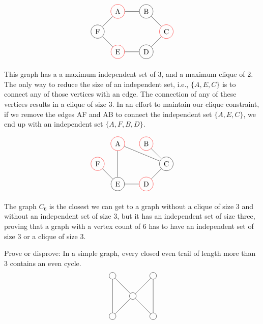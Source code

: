 \documentclass[12pt]{article}
\newenvironment{question}[2][Question]{\begin{trivlist}
\item[\hskip \labelsep {\bfseries #1}\hskip \labelsep {\bfseries #2.}]}{\end{trivlist}}
\begin{document}
\begin{align*}
\begin{tikzpicture}
\node[shape=circle,draw=red] (A) at (1,2) {A};
\node[shape=circle,draw=black] (B) at (2.4142857,2) {B};
\node[shape=circle,draw=red] (C) at (3.4142856,1) {C};
\node[shape=circle,draw=black] (D) at (2.4142857,0) {D};
\node[shape=circle,draw=red] (E) at (1,0) {E};
\node[shape=circle,draw=black] (F) at (0,1) {F};
\path [] (A) edge node[left] {} (B);
\path [] (B) edge node[left] {} (C);
\path [] (C) edge node[left] {} (D);
\path [] (D) edge node[left] {} (E);
\path [] (F) edge node[left] {} (A);
\path [] (E) edge node[left] {} (F);
\end{tikzpicture}
\end{align*}

This graph has a a maximum independent set of 3, and a maximum clique of 2. The only way to reduce the size of an independent set, i.e., $\{A,E,C\}$ is to connect any of those vertices with an edge.  The connection of any of these vertices results in a clique of size 3.  In an effort to maintain our clique constraint, if we remove the edges AF and AB to connect the independent set $\{A,E,C\}$, we end up with an independent set $\{A,F,B, D\}$.

\begin{align*}
\begin{tikzpicture}
\node[shape=circle,draw=red] (A) at (1,2) {A};
\node[shape=circle,draw=red] (B) at (2.4142857,2) {B};
\node[shape=circle,draw=black] (C) at (3.4142856,1) {C};
\node[shape=circle,draw=red] (D) at (2.4142857,0) {D};
\node[shape=circle,draw=black] (E) at (1,0) {E};
\node[shape=circle,draw=red] (F) at (0,1) {F};
\path [] (A) edge node[left] {} (C);
\path [] (B) edge node[left] {} (C);
\path [] (C) edge node[left] {} (D);
\path [] (D) edge node[left] {} (E);
\path [] (E) edge node[left] {} (A);
\path [] (E) edge node[left] {} (F);
\end{tikzpicture}
\end{align*}

The graph $C_6$ is the closest we can get to a graph without a clique of size 3 and without an independent set of size 3, but it has an independent set of size three, proving that a graph with a vertex count of 6 has to have an independent set of size 3 or a clique of size 3.

\begin{question}{2}
Prove or disprove: In a simple graph, every closed even trail of length more than 3 contains an even cycle.
\begin{align*}
\begin{tikzpicture}
\node[shape=circle,draw=black] (B) at (1,0) {};
\node[shape=circle,draw=black] (D) at (1,-2) {};
\node[shape=circle,draw=black] (E) at (2,-1) {};
\node[shape=circle,draw=black] (F) at (3,0) {};
\node[shape=circle,draw=black] (H) at (3,-2) {};
\path [] (B) edge node[left] {} (E);
\path [] (D) edge node[left] {} (E);
\path [] (E) edge node[left] {} (F);
\path [] (H) edge node[left] {} (E);
\path [] (B) edge node[left] {} (D);
\path [] (F) edge node[left] {} (H);
\end{tikzpicture}
\end{align*}
\end{question}
\end{document}
